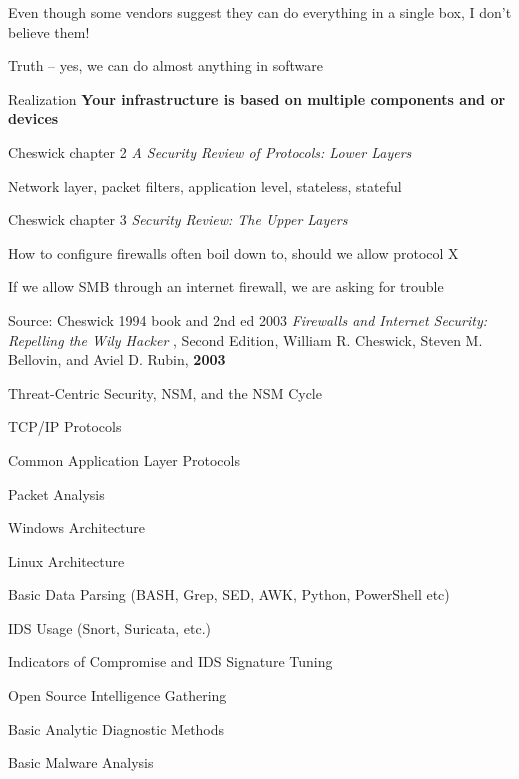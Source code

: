 \documentclass[Screen16to9,17pt]{foils}
\begin{document}
\begin{list2}
\item Even though some vendors suggest they can do everything in a single box, I don't believe them!
\item Truth -- yes, we can do almost anything in software
\item Realization {\bf Your infrastructure is based on multiple components and or devices}
\end{list2}




\begin{list1}
\item Cheswick chapter 2 \emph{A Security Review of Protocols: Lower Layers}
\begin{list2}
\item Network layer, packet filters, application level, stateless, stateful
\end{list2}
\item Cheswick chapter 3 \emph{Security Review: The Upper Layers}
\begin{list2}
\item How to configure firewalls often boil down to, should we allow protocol X
\item If we allow SMB through an internet firewall, we are asking for trouble
\end{list2}
\item Source: Cheswick 1994 book and 2nd ed 2003
\emph{Firewalls and Internet Security: Repelling the Wily Hacker} , Second Edition, William R. Cheswick, Steven M. Bellovin, and Aviel D. Rubin, {\bf 2003} 
\end{list1}


\begin{list2}\small
\item Threat-Centric Security, NSM, and the NSM Cycle
\item TCP/IP Protocols
\item Common Application Layer Protocols
\item Packet Analysis
\item Windows Architecture
\item Linux Architecture
\item Basic Data Parsing (BASH, Grep, SED, AWK, Python, PowerShell etc)
\item IDS Usage (Snort, Suricata, etc.)
\item Indicators of Compromise and IDS Signature Tuning
\item Open Source Intelligence Gathering
\item Basic Analytic Diagnostic Methods
\item Basic Malware Analysis
\end{list2}
\end{document}
